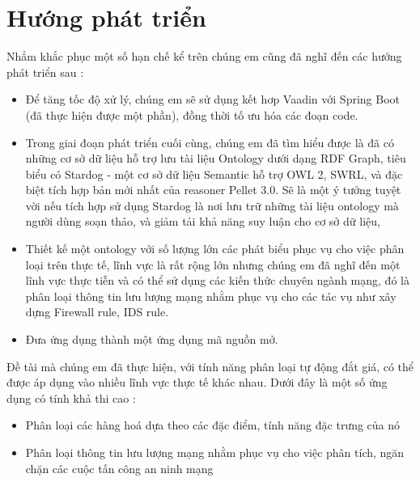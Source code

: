\section{Hướng phát triển}
Nhẳm khắc phục một số hạn chế kể trên chúng em cũng đã nghĩ đến các hướng phát triển sau :
\begin{itemize}
\item Để tăng tốc độ xử lý, chúng em sẽ sử dụng kết hơp Vaadin với Spring Boot (đã thực hiện được một phần), đồng thời tố ưu hóa các đoạn code.
\item Trong giai đoạn phát triển cuối cùng, chúng em đã tìm hiểu được là đã có những cơ sở dữ liệu hỗ trợ lưu tài liệu Ontology dưới dạng RDF Graph, tiêu biểu có Stardog - một cơ sở dữ liệu Semantic hỗ trợ OWL 2, SWRL, và đặc biệt tích hợp bản mới nhất của reasoner Pellet 3.0. Sẽ là một ý tưởng tuyệt vời nếu tích hợp sử dụng Stardog là nơi lưu trữ những tài liệu ontology mà người dùng soạn thảo, và giảm tải khả năng suy luận cho cơ sở dữ liệu,
\item Thiết kế một ontology với số lượng lớn các phát biểu phục vụ cho việc phân loại trên thực tế, lĩnh vực là rất rộng lớn nhưng chúng em đã nghĩ đến một lĩnh vực thực tiễn và có thể sử dụng các kiến thức chuyên ngành mạng, đó là phân loại thông tin lưu lượng mạng nhằm phục vụ cho các tác vụ như xây dựng Firewall rule, IDS rule.
\item Đưa ứng dụng thành một ứng dụng mã nguồn mở.
\end{itemize}

Đề tài mà chúng em đã thực hiện, với tính năng phân loại tự động đắt giá, có thể được áp dụng vào nhiều lĩnh vực thực tế khác nhau. Dưới đây là một số ứng dụng có tính khả thi cao :
\begin{itemize}
\item Phân loại các hàng hoá dựa theo các đặc điểm, tính năng đặc trưng của nó
\item Phân loại thông tin lưu lượng mạng nhằm phục vụ cho việc phân tích, ngăn chặn các cuộc tấn công an ninh mạng
\end{itemize}
